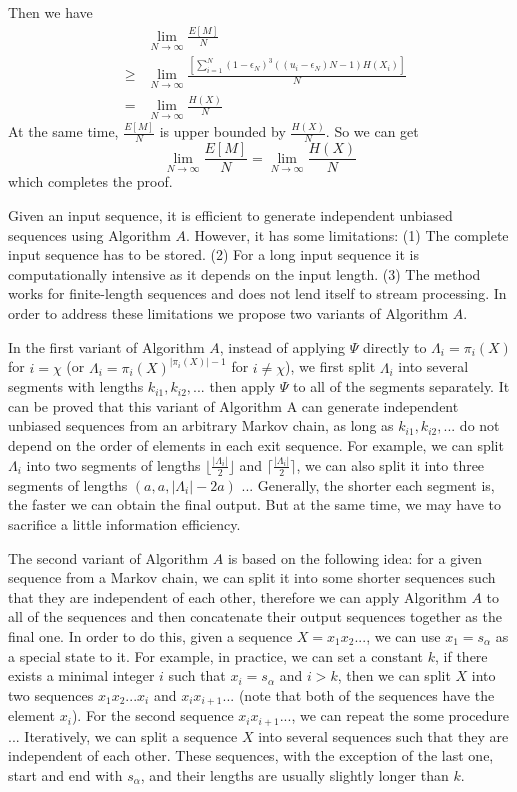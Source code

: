 \documentclass[journal]{IEEEtran}
\begin{document}
Then we have
\begin{eqnarray*}
&&\lim_{N\rightarrow\infty}\frac{E[M]}{N}\\
&\geq&\lim_{N\rightarrow\infty} \frac{[\sum_{i=1}^N (1-\epsilon_N)^3((u_i-\epsilon_N)N-1)H(X_i)]}{N}\\
&=& \lim_{N\rightarrow \infty }\frac{H(X)}{N}
\end{eqnarray*}
At the same time, $\frac{E[M]}{N}$ is upper bounded by $\frac{H(X)}{N}$. So we can get
$$\lim_{N\rightarrow\infty}\frac{E[M]}{N}=\lim_{N\rightarrow \infty }\frac{H(X)}{N}$$
which completes the proof. \hfill\QED

Given an input sequence, it is efficient to generate
independent unbiased sequences using Algorithm $A$. However, it has some limitations: (1) The complete input sequence has to be stored.
(2) For a long input sequence it is computationally intensive as it depends on the input length.
(3) The method works for finite-length sequences and does not lend itself to stream processing.
In order to address these limitations we propose two variants of Algorithm $A$.

In the first variant of Algorithm $A$, instead of applying $\Psi$ directly to $\Lambda_i=\pi_i(X)$ for $i=\chi$ (or $\Lambda_i=\pi_i(X)^{|\pi_i(X)|-1}$ for $i\neq\chi$), we first
split $\Lambda_i$ into several segments with lengths $k_{i1}, k_{i2}, ...$ then apply $\Psi$ to all of the segments separately. It can be proved that this variant of Algorithm A
can generate independent unbiased sequences from an arbitrary Markov chain, as long as $k_{i1}, k_{i2}, ...$ do not depend on the order of elements in each exit sequence.
For example, we can split $\Lambda_i$ into two segments of lengths $\lfloor\frac{|\Lambda_i|}{2}\rfloor$ and $\lceil\frac{|\Lambda_i|}{2}\rceil$, we can also split
it into three segments of lengths $(a,a,|\Lambda_i|-2a)$ ... Generally, the shorter each segment is, the faster we can obtain the final output. But at the same time, we may have to
sacrifice a little information efficiency.

The second variant of Algorithm $A$ is based on the following idea: for a given sequence from a Markov chain, we can
split it into some shorter sequences such that they are independent of each other, therefore we can apply Algorithm $A$ to all of the sequences and then
concatenate their output sequences together as the final one. In order to do this, given a sequence $X=x_1x_2...$, we can use $x_1=s_\alpha$
as a special state to it. For example, in practice, we can set a constant $k$, if there exists a minimal integer $i$ such that $x_i=s_\alpha$ and $i>k$, then
we can split $X$ into two sequences $x_1x_2...x_i$ and $x_ix_{i+1}...$ (note that both of the sequences have the element $x_i$). For the second sequence $x_ix_{i+1}...$,
we can repeat the some procedure ... Iteratively, we can split a sequence $X$ into several sequences such that they are independent of each other. These sequences, with the exception of the last one, start and end with $s_\alpha$, and their lengths are usually slightly longer than $k$.
\end{document}

